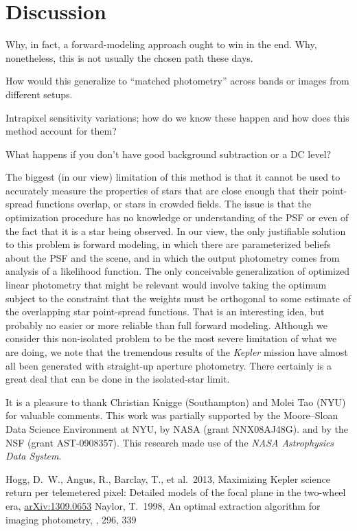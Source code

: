 \documentclass[12pt, letterpaper, preprint]{aastex}
\newcommand{\project}[1]{\textsl{#1}}
\newcommand{\foreign}[1]{\textsl{#1}}
\newcommand{\etal}{\foreign{et\,al.}}
\begin{document}
\section{Discussion}

Why, in fact, a forward-modeling approach ought to win in the end.
Why, nonetheless, this is not usually the chosen path these days.

How would this generalize to ``matched photometry'' across bands or images from different setups.

Intrapixel sensitivity variations;
  how do we know these happen and how does this method account for them?

What happens if you don't have good background subtraction or a DC level?

The biggest (in our view) limitation of this method is that it cannot be used
  to accurately measure the properties of stars
  that are close enough that their point-spread functions overlap,
  or stars in crowded fields.
The issue is that the optimization procedure has no knowledge or understanding
  of the PSF or even of the fact that it is a star being observed.
In our view, the only justifiable solution to this problem is forward modeling,
  in which there are parameterized beliefs about the PSF and the scene,
  and in which the output photometry comes from analysis of a likelihood function.
The only conceivable generalization of optimized linear photometry that might be relevant
  would involve taking the optimum subject to the constraint that the weights must be
  orthogonal to some estimate of the overlapping star point-spread functions.
That is an interesting idea,
  but probably no easier or more reliable than full forward modeling.
Although we consider this non-isolated problem to be the most severe limitation of what we are doing,
  we note that the tremendous results of the \project{Kepler} mission
  have almost all been generated with straight-up aperture photometry.
There certainly is a great deal that can be done in the isolated-star limit.

\acknowledgments
It is a pleasure to thank
  Christian Knigge (Southampton) and
  Molei Tao (NYU)
for valuable comments.
This work was partially supported by the Moore--Sloan Data Science Environment at NYU,
  by NASA (grant NNX08AJ48G).
  and by the NSF (grant AST-0908357).
This research made use of the \project{NASA Astrophysics Data System}.

\newcommand{\arxiv}[1]{\href{http://arxiv.org/abs/#1}{arXiv:#1}}
\begin{thebibliography}{}\raggedright
\bibitem[Hogg \etal(2013)]{hoggwhitepaper}
Hogg, D.~W., Angus, R., Barclay, T., et al.\ 2013,
Maximizing Kepler science return per telemetered pixel: Detailed models of the focal plane in the two-wheel era,
\arxiv{1309.0653}
Naylor, T.\ 1998,
An optimal extraction algorithm for imaging photometry,
\mnras, 296, 339
\end{thebibliography}
\end{document}
